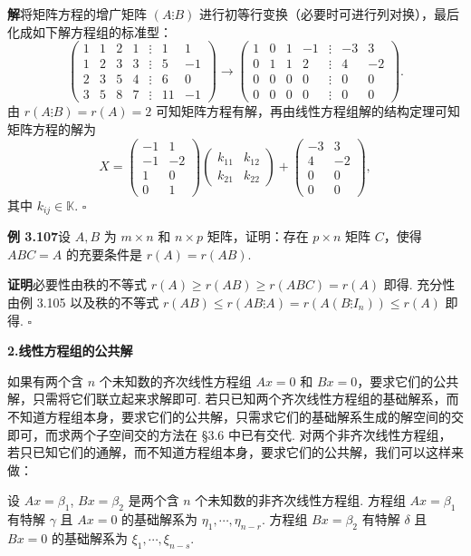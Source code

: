 \documentclass[UTF8, 12pt, fontset=fandol, oneside]{ctexart}
\begin{document}
\noindent\textbf{解}\quad 将矩阵方程的增广矩阵 $(A\vdots B)$ 进行初等行变换（必要时可进行列对换），最后化成如下解方程组的标准型：
\[
\begin{pmatrix}
1&1&2&1&\vdots&1&1\\
1&2&3&3&\vdots&5&-1\\
2&3&5&4&\vdots&6&0\\
3&5&8&7&\vdots&11&-1
\end{pmatrix}
\to
\begin{pmatrix}
1&0&1&-1&\vdots&-3&3\\
0&1&1&2&\vdots&4&-2\\
0&0&0&0&\vdots&0&0\\
0&0&0&0&\vdots&0&0
\end{pmatrix}.
\]
由 $r(A\vdots B)=r(A)=2$ 可知矩阵方程有解，再由线性方程组解的结构定理可知矩阵方程的解为
\[
X=\begin{pmatrix}
-1&1\\
-1&-2\\
1&0\\
0&1
\end{pmatrix}
\begin{pmatrix}
k_{11}&k_{12}\\
k_{21}&k_{22}
\end{pmatrix}
+
\begin{pmatrix}
-3&3\\
4&-2\\
0&0\\
0&0
\end{pmatrix},
\]
其中 $k_{ij}\in\mathbb{K}$. $\square$

\noindent\textbf{例 3.107}\quad 设 $A,B$ 为 $m\times n$ 和 $n\times p$ 矩阵，证明：存在 $p\times n$ 矩阵 $C$，使得 $ABC=A$ 的充要条件是 $r(A)=r(AB)$.

\noindent\textbf{证明}\quad 必要性由秩的不等式 $r(A)\ge r(AB)\ge r(ABC)=r(A)$ 即得. 充分性由例 3.105 以及秩的不等式 $r(AB)\le r(AB\vdots A)=r(A(B\vdots I_n))\le r(A)$ 即得. $\square$

\noindent\textbf{2.\quad 线性方程组的公共解}

如果有两个含 $n$ 个未知数的齐次线性方程组 $Ax=0$ 和 $Bx=0$，要求它们的公共解，只需将它们联立起来求解即可. 若只已知两个齐次线性方程组的基础解系，而不知道方程组本身，要求它们的公共解，只需求它们的基础解系生成的解空间的交即可，而求两个子空间交的方法在 §3.6 中已有交代. 对两个非齐次线性方程组，若只已知它们的通解，而不知道方程组本身，要求它们的公共解，我们可以这样来做：

设 $Ax=\beta_1$, $Bx=\beta_2$ 是两个含 $n$ 个未知数的非齐次线性方程组. 方程组 $Ax=\beta_1$ 有特解 $\gamma$ 且 $Ax=0$ 的基础解系为 $\eta_1,\cdots,\eta_{n-r}$. 方程组 $Bx=\beta_2$ 有特解 $\delta$ 且 $Bx=0$ 的基础解系为 $\xi_1,\cdots,\xi_{n-s}$.
\end{document}
